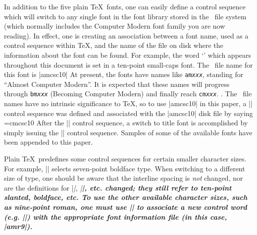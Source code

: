In addition to the
five plain \TeX\ fonts, one can easily define a control sequence
which will switch to 
any single font in the font library stored in the \Unix\ file system
(which normally includes the Computer Modern font family you are
now reading).  In effect, one is creating an association between
a font name, used as a control sequence within \TeX, and the name
of the file on disk where the information about the font can be found.
For example, the word `\Unix' which appears
throughout this document is set in
a ten-point small-caps
font.  The \Unix\ file name for this font is |amcsc10|\note
{At present, the fonts have names like {\tt am\it xxx\/}, standing
for ``Almost Computer Modern''.  It is expected that these
names will progress through {\tt bm\it xxx\/} (Becoming Computer
Modern) and finally reach {\tt cm\it xxx\/}.
}.
The \Unix\ file names have no intrinsic significance to \TeX,
so to use
|amcsc10| in this paper, a |\csc| control sequence was defined
and associated with the |amcsc10| disk file
by saying
\begintt
\font\csc=cmcsc10
\endtt
After the |\font| control sequence, a switch to title font
is accomplished by simply issuing the |\csc| control sequence.
Samples of some of the available fonts have been appended to
this paper.

Plain \TeX\ predefines some control sequences for certain
smaller character
sizes.  For example, |\sevenbf| selects {\sevenbf seven-point boldface}
type.  When switching to a different size of type, one should be
aware that the interline spacing is {\sl not\/} changed, nor are
the definitions for |\sl|, |\bf|, etc. changed; they still refer
to ten-point slanted, boldface, etc.
To use the other available character sizes, such as nine-point
roman,
one must use |\font| to
associate a new control word (e.g. |\ninerm|) with the appropriate
font information file (in this case, |amr9|).

